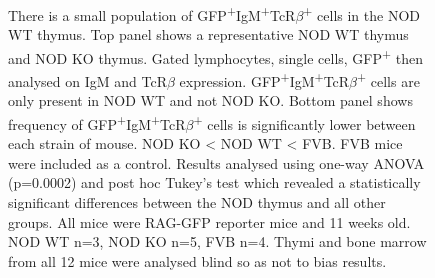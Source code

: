 \begin{figure}
\begin{subfigure}{\textwidth}
	\caption{}
	\label{subfig:IgMTcRposgraph}
	\end{subfigure}
\caption[There is a very small population of IgM\textsuperscript{+}TcR$\beta$\textsuperscript{+} cells in the NOD thymus]{There is a small population of GFP\textsuperscript{+}IgM\textsuperscript{+}TcR$\beta$\textsuperscript{+} cells in the NOD WT thymus. 
Top panel shows a representative NOD WT thymus and NOD KO thymus.
Gated lymphocytes, single cells, GFP\textsuperscript{+} then analysed on IgM and TcR$\beta$ expression.
GFP\textsuperscript{+}IgM\textsuperscript{+}TcR$\beta$\textsuperscript{+} cells are only present in NOD WT and not NOD KO.
Bottom panel shows frequency of GFP\textsuperscript{+}IgM\textsuperscript{+}TcR$\beta$\textsuperscript{+} cells is significantly lower between each strain of mouse. NOD KO < NOD WT < FVB. FVB mice were included as a control.
Results analysed using one-way ANOVA (p=0.0002) and post hoc Tukey's test which revealed a statistically significant differences between the NOD thymus and all other groups.
All mice were RAG-GFP reporter mice and 11 weeks old. NOD WT n=3, NOD KO n=5, FVB n=4.
Thymi and bone marrow from all 12 mice were analysed blind so as not to bias results.}
\label{fig:RAGIgMTcRpos}
\end{figure}











